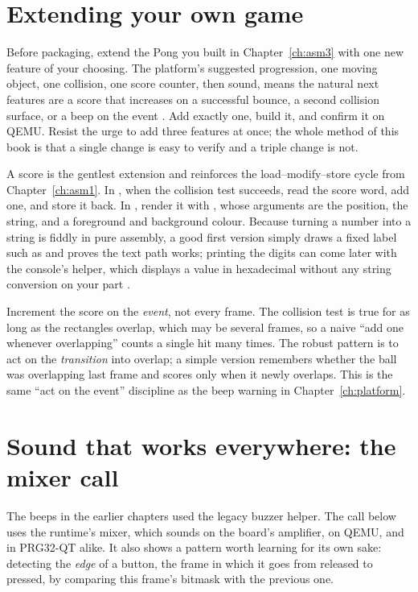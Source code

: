 \section{Extending your own game}

Before packaging, extend the Pong you built in Chapter~\ref{ch:asm3} with one new
feature of your choosing. The platform's suggested progression, one moving
object, one collision, one score counter, then sound, means the natural next
features are a score that increases on a successful bounce, a second collision
surface, or a beep on the event \citep{prg32tutorial}. Add exactly one, build it,
and confirm it on QEMU. Resist the urge to add three features at once; the whole
method of this book is that a single change is easy to verify and a triple change
is not.

A score is the gentlest extension and reinforces the load--modify--store cycle
from Chapter~\ref{ch:asm1}. In , when the collision test succeeds,
read the score word, add one, and store it back. In , render it with
, whose arguments are the position, the string, and a
foreground and background colour. Because turning a number into a string is
fiddly in pure assembly, a good first version simply draws a fixed label such as
 and proves the text path works; printing the digits can come later
with the console's  helper, which displays a value in
hexadecimal without any string conversion on your part \citep{prg32repo}.

\begin{prgwarn}
Increment the score on the \emph{event}, not every frame. The collision test is
true for as long as the rectangles overlap, which may be several frames, so a
naive ``add one whenever overlapping'' counts a single hit many times. The robust
pattern is to act on the \emph{transition} into overlap; a simple version remembers
whether the ball was overlapping last frame and scores only when it newly
overlaps. This is the same ``act on the event'' discipline as the beep warning in
Chapter~\ref{ch:platform}.
\end{prgwarn}

\section{Sound that works everywhere: the mixer call}

The beeps in the earlier chapters used the legacy buzzer helper. The call below
uses the runtime's mixer, which sounds on the board's amplifier, on QEMU, and in
PRG32-QT alike. It also shows a pattern worth learning for its own sake:
detecting the \emph{edge} of a button, the frame in which it goes from released
to pressed, by comparing this frame's bitmask with the previous one.

